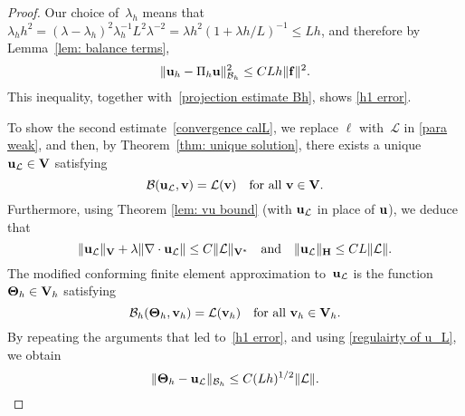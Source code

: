 \documentclass[11pt]{article}
\newcommand{\calB}{\mathcal{B}}
\newcommand{\calL}{\mathcal{L}}
\newcommand{\vf}{{\bf f}}
\newcommand{\vu}{{\bf u}}
\newcommand{\vv}{{\bf v}}
\newcommand{\vV}{{\bf V}}
\numberwithin{equation}{section}
\begin{document}
\begin{proof} 
Our choice of~$\lambda_h$ means that
$\lambda_h h^2=(\lambda-\lambda_h)^2\lambda_h^{-1}L^2\lambda^{-2}
    =\lambda h^2(1+\lambda h/L)^{-1}\le Lh$, and therefore by
Lemma~\ref{lem: balance terms},
\begin{equation}\label{eq: uh Pih u}
\|\vu_h-\Pi_h \vu\|_{\calB_h}^2 \le CLh\|\vf\|^2.
\end{equation}
This inequality, together with~\eqref{projection estimate Bh}, shows
\eqref{h1 error}.

To show the second estimate~\eqref{convergence calL}, we replace $\ell$
with~$\calL$ in \eqref{para weak}, and then, by
Theorem~\ref{thm: unique solution}, there exists a unique~$\vu_{\calL} \in \vV$ satisfying
\begin{equation}\label{weak form uL}
\calB(\vu_{\calL}, \vv) = \calL(\vv)\quad\text{for all $\vv \in \vV$.}
\end{equation}
Furthermore, using  Theorem \ref{lem: vu bound} (with $\vu_{\calL}$ in place of $\vu$), we deduce that  
\begin{equation}\label{regulairty of u_L}
    \|\vu_{\calL}\|_{\vV}+\lambda\|\nabla\cdot \vu_{\calL}\| \le C\|\calL\|_{\vV^*}\quad{\rm and}\quad 
\|\vu_{\calL}\|_{\bf H}\le CL\|\calL\|.
\end{equation}
The modified conforming finite element approximation to~$\vu_{\calL}$ is the
function~$\mathbf{\Theta}_h\in\vV_h$ satisfying
\begin{equation}\label{weak form uL discrete}
\calB_h(\mathbf{\Theta}_h,\vv_h) = \calL(\vv_h)
\quad\text{for all $\vv_h \in\vV_h$.}
\end{equation}
By repeating the arguments that led to~\eqref{h1 error}, and using
\eqref{regulairty of u_L}, we obtain
\begin{equation}\label{projection estimate ucalL}
\|\mathbf{\Theta}_h-\vu_{\calL}\|_{\calB_h}\le C(Lh)^{1/2}\|\calL\|.
\end{equation}


\end{proof}
\end{document}
